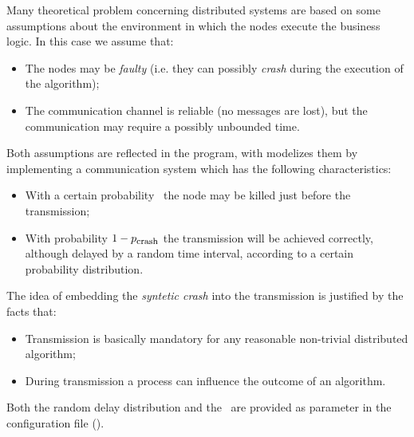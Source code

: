 Many theoretical problem concerning distributed systems are based on some
assumptions about the environment in which the nodes execute the business
logic. In this case we assume that:
\begin{itemize}

\item   The nodes may be \emph{faulty} (i.e. they can possibly
        \emph{crash} during the execution of the algorithm);

\item   The communication channel is reliable (no messages are lost),
        but the communication may require a possibly unbounded time.

\end{itemize}

Both assumptions are reflected in the program, with modelizes them by
implementing a communication system which has the following
characteristics:
\begin{itemize}

\item   With a certain probability \PCrash\ the node may be
        killed just before the transmission;

\item   With probability $1 - p_{\mbox{\footnotesize{crash}}}$ the transmission will
        be achieved correctly, although delayed by a random time interval,
        according to a certain probability distribution.

\end{itemize}

The idea of embedding the \emph{syntetic crash} into the transmission is
justified by the facts that:
\begin{itemize}

\item   Transmission is basically mandatory for any reasonable non-trivial
        distributed algorithm;

\item   During transmission a process can influence the outcome of an
        algorithm.

\end{itemize}

Both the random delay distribution and the \PCrash\ are provided
as parameter in the configuration file
().

